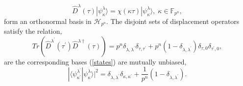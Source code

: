 \documentclass{article}
\begin{document}
\begin{equation}
\hat{D}^{\lambda }(\tau )|\psi _{\kappa }^{\lambda }\rangle =\chi (\kappa
\tau )|\psi _{\kappa }^{\lambda }\rangle ,\;\kappa \in \mathbb{F}_{p^{n}},
\label{states}
\end{equation}%
form an orthonormal basis in $\mathcal{H}_{p^{n}}$. The disjoint sets of
displacement operators satisfy the relation,%
\begin{equation*}
Tr\left( \hat{D}^{\lambda ^{\prime }}(\tau ^{\prime })\hat{D}^{\lambda
\dagger }(\tau )\right) =p^{n}\delta _{\lambda ,\lambda ^{\prime }}\delta
_{\tau ,\tau ^{\prime }}+p^{n}(1-\delta _{\lambda ,\lambda ^{\prime
}})\delta _{\tau ,0}\delta _{\tau ^{\prime },0},
\end{equation*}%
are the corresponding bases (\ref{states}) are mutually unbiased,%
\begin{equation}
|\langle \psi _{\kappa ^{\prime }}^{\lambda ^{\prime }}|\psi _{\kappa
}^{\lambda }\rangle |^{2}=\delta _{\lambda ,\lambda ^{\prime }}\delta
_{\kappa ,\kappa ^{\prime }}+\frac{1}{p^{n}}(1-\delta _{\lambda ,\lambda
^{\prime }}).  \label{UB}
\end{equation}
\end{document}
